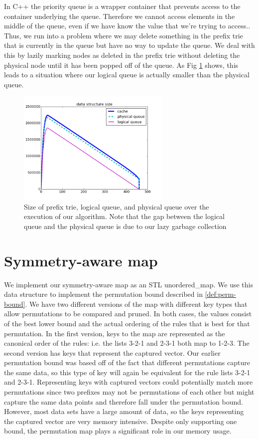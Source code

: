 In C++ the priority queue is a wrapper container that prevents access to the container underlying the queue.
Therefore we cannot access elements in the middle of the queue, even if we have know the value that we're trying to access..
Thus, we run into a problem where we may delete something in the prefix trie that is currently in the queue but have no way to update the queue.
We deal with this by lazily marking nodes as deleted in the prefix trie without deleting the physical node until it has been popped off of the queue.
As Fig \ref{fig:queue_gc} shows, this leads to a situation where our logical queue is actually smaller than the physical queue.

\begin{figure}[t!]
\begin{center}
\includegraphics[width=0.65\textwidth]{figs/ela_compas-queue-cache-size-insertions.png}
\end{center}
\caption{Size of prefix trie, logical queue, and physical queue over the execution of our algorithm. Note that the gap between the logical queue and the physical queue is due to our lazy garbage collection}
\label{fig:queue_gc}
\end{figure}

\section{Symmetry-aware map}
We implement our symmetry-aware map as an STL unordered\_map.
We use this data structure to implement the permutation bound described in \ref{def:perm-bound}.
We have two different versions of the map with different key types that allow permutations to be compared and pruned.
In both cases, the values consist of the best lower bound and the actual ordering of the rules that is best for that permutation.
In the first version, keys to the map are represented as the canonical order of the rules: i.e. the lists 3-2-1 and 2-3-1 both map to 1-2-3.
The second version has keys that represent the captured vector.
Our earlier permutation bound was based off of the fact that different permutations capture the same data, so this type of key will again be equivalent for the rule lists 3-2-1 and 2-3-1.
Representing keys with captured vectors could potentially match more permutations since two prefixes may not be permutations of each other but might capture the same data points and therefore fall under the permutation bound.
However, most data sets have a large amount of data, so the keys representing the captured vector are very memory intensive.
Despite only supporting one bound, the permutation map plays a significant role in our memory usage.

